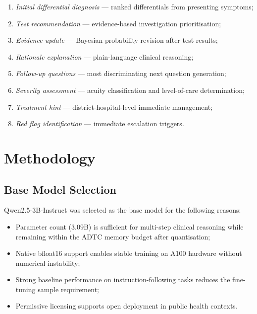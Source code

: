\documentclass[conference]{IEEEtran}
\begin{document}
\begin{enumerate}
  \item \textit{Initial differential diagnosis} --- ranked
        differentials from presenting symptoms;
  \item \textit{Test recommendation} --- evidence-based
        investigation prioritisation;
  \item \textit{Evidence update} --- Bayesian probability revision
        after test results;
  \item \textit{Rationale explanation} --- plain-language clinical
        reasoning;
  \item \textit{Follow-up questions} --- most discriminating next
        question generation;
  \item \textit{Severity assessment} --- acuity classification and
        level-of-care determination;
  \item \textit{Treatment hint} --- district-hospital-level
        immediate management;
  \item \textit{Red flag identification} --- immediate
        escalation triggers.
\end{enumerate}

\section{Methodology}
\label{sec:method}

\subsection{Base Model Selection}

Qwen2.5-3B-Instruct \cite{qwen2025} was selected as the base model
for the following reasons:
\begin{itemize}
  \item Parameter count (3.09B) is sufficient for multi-step clinical
        reasoning while remaining within the ADTC memory budget after
        quantisation;
  \item Native bfloat16 support enables stable training on A100
        hardware without numerical instability;
  \item Strong baseline performance on instruction-following tasks
        reduces the fine-tuning sample requirement;
  \item Permissive licensing supports open deployment in public
        health contexts.
\end{itemize}
\end{document}
